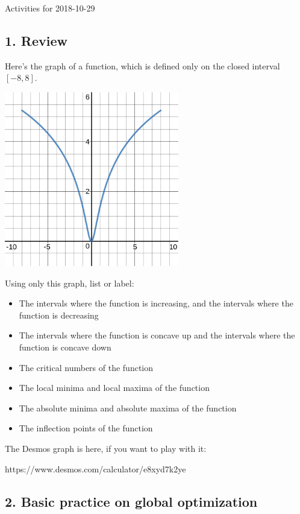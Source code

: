 \documentclass[11pt]{article}
\begin{document}
\begin{center}
    \Large{Activities for 2018-10-29}
\end{center}


\subsection*{1. Review}
Here's the graph of a function, which is defined only on the closed interval $[-8,8]$. 
\begin{center}
    \includegraphics[width=3in]{34-review.png}
\end{center}
Using only this graph, list or label: 
\begin{itemize}
    \item The intervals where the function is increasing, and the intervals where the function is decreasing
    \item The intervals where the function is concave up and the intervals where the function is concave down
    \item The critical numbers of the function
    \item The local minima and local maxima of the function
    \item The absolute minima and absolute maxima of the function
    \item The inflection points of the function
\end{itemize}
The Desmos graph is here, if you want to play with it: 
\begin{center}
    https://www.desmos.com/calculator/e8xyd7k2ye 
\end{center}


\subsection*{2. Basic practice on global optimization}
\end{document}
